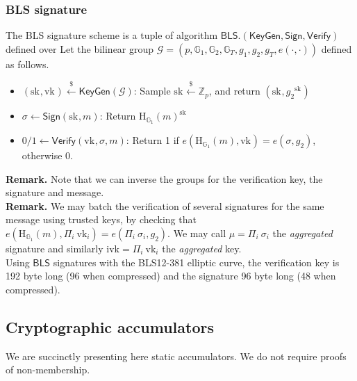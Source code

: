 \documentclass{article}
\newcommand{\Zp}{\ensuremath{\mathbb{Z}_p}\xspace}
\newcommand{\G}[1]{\ensuremath{\mathbb{G}_{#1}}\xspace}
\newcommand{\Hash}[1]{\ensuremath{\textrm{H}_{#1}}\xspace}
\newcommand{\vk}[1]{\ensuremath{\textrm{vk}_{#1}}\xspace}
\newcommand{\sk}[1]{\ensuremath{\textrm{sk}_{#1}}\xspace}
\newcommand{\e}[2]{\ensuremath{e(#1,\xspace #2)}\xspace}
\newcommand{\ivk}{\ensuremath{\textrm{ivk}}\xspace}
\newcommand{\BLS}{\ensuremath{\mathsf{BLS}}\xspace}
\newcommand{\KeyGen}{\ensuremath{\mathsf{KeyGen}}\xspace}
\newcommand{\Sign}{\ensuremath{\mathsf{Sign}}\xspace}
\newcommand{\Verify}{\ensuremath{\mathsf{Verify}}\xspace}
\newcommand{\sample}{\ensuremath{\xleftarrow{\$}}\xspace}
\begin{document}
%
\subsubsection{BLS signature}

The BLS signature scheme is a tuple of algorithm $\BLS.(\KeyGen, \Sign, \Verify)$ defined over Let the bilinear group $\mathcal{G} = (p,\G{1}, \G{2}, \G{T}, g_1, g_2, g_T, \e{\cdot}{\cdot})$ defined as follows.

\begin{itemize}
    \item $(\sk{}, \vk{}) \sample \KeyGen(\mathcal{G})$: Sample $\sk{} \sample \Zp$, and return $(\sk{}, {g_2}^\sk{})$
    \item $\sigma \leftarrow \Sign(\sk{}, m)$: Return $\Hash{\G{1}}(m)^\sk{}$
    \item $0/1 \leftarrow \Verify(\vk{}, \sigma, m)$: Return 1 if $\e{\Hash{\G{1}}(m)}{\vk{}} = \e{\sigma}{g_2}$, otherwise 0.
\end{itemize}

\noindent\textbf{Remark.} Note that we can inverse the groups for the verification key, the signature and message.\\

\noindent\textbf{Remark.} We may batch the verification of several signatures for the same message using trusted keys, by checking that $\e{\Hash{\G{1}}(m)}{\Pi_i\ \vk{i}} = \e{\Pi_i\ \sigma_i}{g_2}$. We may call $\mu = \Pi_i\ \sigma_i$ the \textit{aggregated} signature and similarly $\ivk = \Pi_i\ \vk{i}$ the \textit{aggregated} key.\\

Using \BLS signatures with the BLS12-381 elliptic curve, the verification key is 192 byte long (96 when compressed) and the signature 96 byte long (48 when compressed).


%
%
\subsection{Cryptographic accumulators}
We are succinctly presenting here static accumulators.  We do not require proofs of non-membership.
\end{document}
